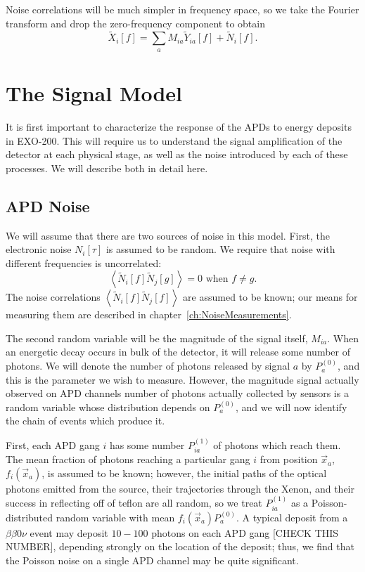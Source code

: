 Noise correlations will be much simpler in frequency space, so we take the Fourier transform and drop the zero-frequency component to obtain
\begin{equation}
\widetilde{X}_i[f] = \sum_a M_{ia}\widetilde{Y}_{ia}[f] + \widetilde{N}_i[f].
\end{equation}

\section{The Signal Model}

It is first important to characterize the response of the APDs to energy deposits in EXO-200.  This will require us to understand the signal amplification of the detector at each physical stage, as well as the noise introduced by each of these processes.  We will describe both in detail here.

\subsection{APD Noise}

We will assume that there are two sources of noise in this model.  First, the electronic noise $N_i[\tau]$ is assumed to be random.  We require that noise with different frequencies is uncorrelated:
\[\left< \widetilde{N}_i[f] \widetilde{N}_j[g] \right> = 0 \text{~when~} f \ne g.\]
The noise correlations $\left< \widetilde{N}_i[f] \widetilde{N}_j[f] \right>$ are assumed to be known; our means for measuring them are described in chapter~\ref{ch:NoiseMeasurements}.

The second random variable will be the magnitude of the signal itself, $M_{ia}$.  When an energetic decay occurs in bulk of the detector, it will release some number of photons.  We will denote the number of photons released by signal $a$ by $P^{(0)}_a$, and this is the parameter we wish to measure.  However, the magnitude signal actually observed on APD channels number of photons actually collected by sensors is a random variable whose distribution depends on $P^{(0)}_a$, and we will now identify the chain of events which produce it.

First, each APD gang $i$ has some number $P^{(1)}_{ia}$ of photons which reach them.  The mean fraction of photons reaching a particular gang $i$ from position $\vec{x}_a$, $f_i(\vec{x}_a)$, is assumed to be known; however, the initial paths of the optical photons emitted from the source, their trajectories through the Xenon, and their success in reflecting off of teflon are all random, so we treat $P^{(1)}_{ia}$ as a Poisson-distributed random variable with mean $f_i(\vec{x}_a)P^{(0)}_a$.  A typical deposit from a $\beta\beta 0\nu$ event may deposit $10-100$ photons on each APD gang [CHECK THIS NUMBER], depending strongly on the location of the deposit; thus, we find that the Poisson noise on a single APD channel may be quite significant.

